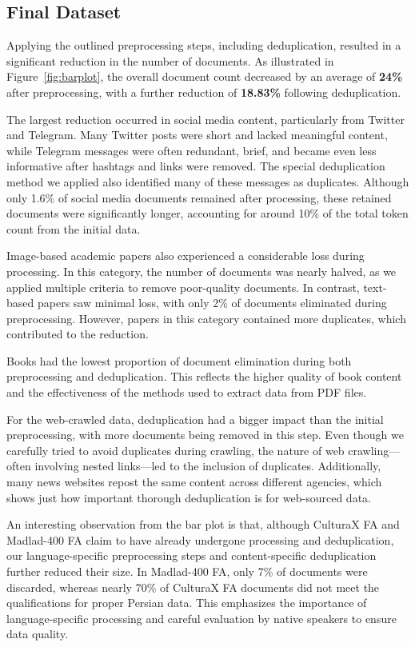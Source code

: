 

\subsection{Final Dataset}
Applying the outlined preprocessing steps, including deduplication, resulted in a significant reduction in the number of documents. As illustrated in Figure~\ref{fig:barplot}, the overall document count decreased by an average of \textbf{24\%} after preprocessing, with a further reduction of \textbf{18.83\%} following deduplication.

The largest reduction occurred in social media content, particularly from Twitter and Telegram. Many Twitter posts were short and lacked meaningful content, while Telegram messages were often redundant, brief, and became even less informative after hashtags and links were removed. The special deduplication method we applied also identified many of these messages as duplicates. Although only 1.6\% of social media documents remained after processing, these retained documents were significantly longer, accounting for around 10\% of the total token count from the initial data.

Image-based academic papers also experienced a considerable loss during processing. In this category, the number of documents was nearly halved, as we applied multiple criteria to remove poor-quality documents. In contrast, text-based papers saw minimal loss, with only 2\% of documents eliminated during preprocessing. However, papers in this category contained more duplicates, which contributed to the reduction.

Books had the lowest proportion of document elimination during both preprocessing and deduplication. This reflects the higher quality of book content and the effectiveness of the methods used to extract data from PDF files.

For the web-crawled data, deduplication had a bigger impact than the initial preprocessing, with more documents being removed in this step. Even though we carefully tried to avoid duplicates during crawling, the nature of web crawling—often involving nested links—led to the inclusion of duplicates. Additionally, many news websites repost the same content across different agencies, which shows just how important thorough deduplication is for web-sourced data.

An interesting observation from the bar plot is that, although CulturaX FA \citep{nguyen2023culturax} and Madlad-400 FA \citep{kudugunta2024madlad} claim to have already undergone processing and deduplication, our language-specific preprocessing steps and content-specific deduplication further reduced their size. In Madlad-400 FA, only 7\% of documents were discarded, whereas nearly 70\% of CulturaX FA documents did not meet the qualifications for proper Persian data. This emphasizes the importance of language-specific processing and careful evaluation by native speakers to ensure data quality.

